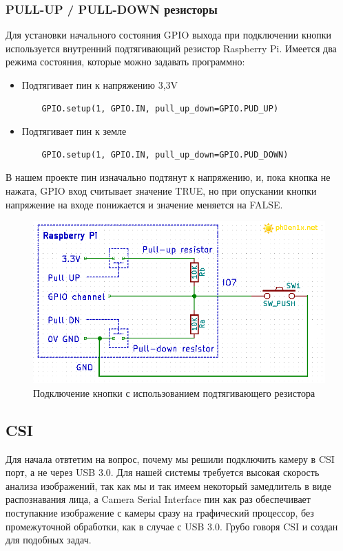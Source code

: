 \documentclass[a4paper,11pt]{article}
\begin{document}
\subsubsection{PULL-UP / PULL-DOWN резисторы}
Для установки начального состояния GPIO выхода при подключении кнопки используется внутренний подтягивающий резистор Raspberry Pi. Имеется два режима состояния, которые можно задавать программно:
\begin{itemize}
  \item Подтягивает пин к напряжению 3,3V\begin{verbatim}
    GPIO.setup(1, GPIO.IN, pull_up_down=GPIO.PUD_UP)
  \end{verbatim} 
  \item Подтягивает пин к земле
  \begin{verbatim}
    GPIO.setup(1, GPIO.IN, pull_up_down=GPIO.PUD_DOWN) 
  \end{verbatim}
\end{itemize}

\noindent В нашем проекте пин изначально подтянут к напряжению, и, пока кнопка не нажата, GPIO вход считывает значение TRUE, но при опускании кнопки напряжение на входе понижается и значение меняется на FALSE. \\

\begin{figure}[h!]
  \begin{center}
    \includegraphics[scale=0.55]{images/рис_10.png}
  \caption{Подключение кнопки с использованием подтягивающего резистора}
  \end{center}
\end{figure}

\subsection{CSI}
\noindent Для начала отвтетим на вопрос, почему мы решили подключить камеру в CSI порт, а не через USB 3.0. Для нашей системы требуется высокая скорость анализа изображений, так как мы и так имеем некоторый замедлитель в виде распознавания лица, а Camera Serial Interface пин как раз обеспечивает поступакние изображение с камеры сразу на графический процессор, без промежуточной обработки, как в случае с USB 3.0. Грубо говоря CSI и создан для подобных задач. \\
\end{document}
